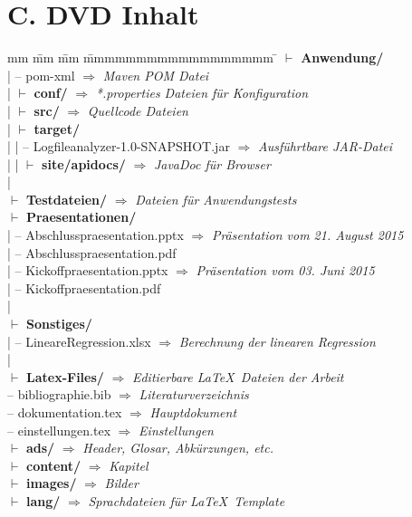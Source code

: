 \section*{C. DVD Inhalt}
\begin{tabbing}
	mm \= mm \= mm \= mmmmmmmmmmmmmmmmmm \= \kill
	$\vdash$ \textbf{Anwendung/} \\ 
	| \> -- pom-xml \> \> \> $\Rightarrow$ \textit{Maven POM Datei} \\
	| \> $\vdash$ \textbf{conf/} \> \> \> $\Rightarrow$ \textit{*.properties Dateien für Konfiguration} \\
	| \> $\vdash$ \textbf{src/} \> \> \> $\Rightarrow$ \textit{Quellcode Dateien} \\
	| \> $\vdash$ \textbf{target/} \\
	| \> | \> -- Logfileanalyzer-1.0-SNAPSHOT.jar \> \> $\Rightarrow$ \textit{Ausführtbare JAR-Datei} \\
	| \> | \> $\vdash$ \textbf{site/apidocs/} \> \> $\Rightarrow$ \textit{JavaDoc für Browser} \\
	| \\
	$\vdash$ \textbf{Testdateien/} \> \> \> \> $\Rightarrow$ \textit{Dateien für Anwendungstests} \\
	$\vdash$ \textbf{Praesentationen/} \\
	| \> -- Abschlusspraesentation.pptx \> \> \> $\Rightarrow$ \textit{Präsentation vom 21. August 2015} \\
	| \> -- Abschlusspraesentation.pdf \\
	| \> -- Kickoffpraesentation.pptx \> \> \> $\Rightarrow$ \textit{Präsentation vom 03. Juni 2015} \\
	| \> -- Kickoffpraesentation.pdf \\
	| \\
	$\vdash$ \textbf{Sonstiges/} \\
	| \> -- LineareRegression.xlsx \> \> \> $\Rightarrow$ \textit{Berechnung der linearen Regression} \\
	| \\
	$\vdash$ \textbf{Latex-Files/} \> \> \> \> $\Rightarrow$ \textit{Editierbare \LaTeX~Dateien der Arbeit}\\ %
	\> -- bibliographie.bib \> \> \> $\Rightarrow$ \textit{Literaturverzeichnis} \\
	\> -- dokumentation.tex \> \> \> $\Rightarrow$ \textit{Hauptdokument} \\
	\> -- einstellungen.tex \> \> \> $\Rightarrow$ \textit{Einstellungen} \\
	\> $\vdash$  \textbf{ads/}   	\> \> \> $\Rightarrow$ \textit{Header, Glosar, Abkürzungen, etc.}\\
	\> $\vdash$  \textbf{content/}  \> \> \> $\Rightarrow$ \textit{Kapitel}\\
	\> $\vdash$  \textbf{images/}   \> \> \> $\Rightarrow$ \textit{Bilder}\\
	\> $\vdash$  \textbf{lang/}  \> \> \> $\Rightarrow$ \textit{Sprachdateien für \LaTeX~Template}\\
	\> 
\end{tabbing}
